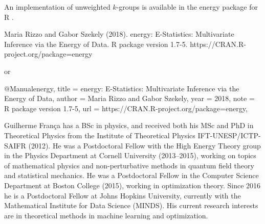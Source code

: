 

An implementation of unweighted $k$-groups is available in the
energy package for R \cite{energy}.



  Maria Rizzo and Gabor Szekely (2018). energy: E-Statistics: Multivariate Inference via the Energy of
  Data. R package version 1.7-5. https://CRAN.R-project.org/package=energy

or 

@Manual{energy,
    title = {energy: E-Statistics: Multivariate Inference via the Energy of Data},
    author = {Maria Rizzo and Gabor Szekely},
    year = {2018},
    note = {R package version 1.7-5},
    url = {https://CRAN.R-project.org/package=energy},
  }


%

\begin{IEEEbiography}{Guilherme Fran\c ca}
has a BSc in physics, and received both his MSc and
PhD in Theoretical Physics from the Institute of
Theoretical Physics IFT-UNESP/ICTP-SAIFR (2012). He was a Postdoctoral Fellow
with the High Energy Theory group in the Physics Department
at Cornell University (2013--2015), working on topics of mathematical physics
and non-perturbative methods in quantum field theory
and statistical mechanics.
He was a Postdoctoral Fellow in
the Computer Science Department at Boston College (2015), working in
optimization theory.
Since 2016 he is a Postdoctoral Fellow at Johns Hopkins University, currently
with the Mathematical Institute for Data Science (MINDS).
His current research interests are in theoretical methods in
machine learning
and optimization.
\end{IEEEbiography}

